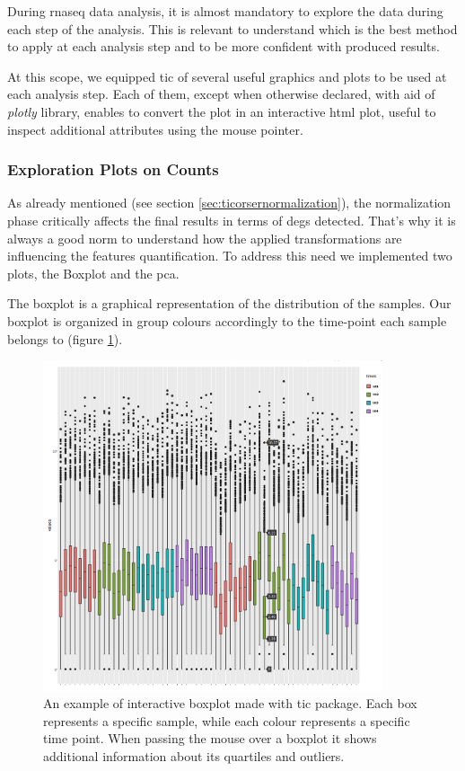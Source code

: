 During \gls{rnaseq} data analysis, it is almost mandatory to explore the data during each step of the analysis.
This is relevant to understand which is the best method to apply at each analysis step and to be more confident with produced results. 

At this scope, we equipped \gls{tic} of several useful graphics and plots to be used at each analysis step.
Each of them, except when otherwise declared, with aid of \textit{plotly} library, enables to convert the plot in an interactive \gls{html} plot, useful to inspect additional attributes using the mouse pointer.

\subsubsection{Exploration Plots on Counts}
As already mentioned (see section \ref{sec:ticorsernormalization}), the normalization phase critically affects the final results in terms of \glspl{deg} detected.
That's why it is always a good norm to understand how the applied transformations are influencing the features quantification. 
To address this need we implemented two plots, the Boxplot and the \gls{pca}.

The boxplot is a graphical representation of the distribution of the samples. 
Our boxplot is organized in group colours accordingly to the time-point each sample belongs to (figure \ref{fig:ticorserboxplot}).

\begin{figure}[H]
\centering
\includegraphics[width=10cm, keepaspectratio]{img/ticorser/boxplot_example.png}
\caption[\gls{tic} boxplot]{An example of interactive boxplot made with \gls{tic} package. Each box represents a specific sample, while each colour represents a specific time point. When passing the mouse over a boxplot it shows additional information about its quartiles and outliers.}
\label{fig:ticorserboxplot}
\end{figure}

